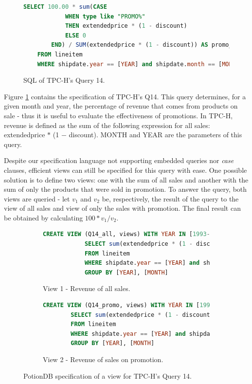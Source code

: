 \documentclass[sigplan,review,anonymous]{acmart}
\begin{document}
\begin{figure}[h]
	\begin{lstlisting}[language=SQL]
	SELECT 100.00 * sum(CASE
			WHEN type like "PROMO%"
			THEN extendedprice * (1 - discount)
			ELSE 0
		END) / SUM(extendedprice * (1 - discount)) AS promo_revenue
	FROM lineitem
	WHERE shipdate.year == [YEAR] and shipdate.month == [MONTH]
	\end{lstlisting}
	\caption{SQL of TPC-H's Query 14.}
	\label{fig:q14}
\end{figure}

Figure \ref{fig:q14} contains the specification of TPC-H's Q14.
This query determines, for a given month and year, the percentage of revenue that comes from products on sale - thus it is useful to evaluate the effectiveness of promotions.
In TPC-H, revenue is defined as the sum of the following expression for all sales: extendedprice $*$ (1 $-$ discount).
MONTH and YEAR are the parameters of this query.

Despite our specification language not supporting embedded queries nor \emph{case} clauses, efficient views can still be specified for this query with ease.
One possible solution is to define two views: %
one with the sum of all sales and another with the sum of only the products that were sold in promotion.
To answer the query, both views are queried - let $v_1$ and $v_2$ be, respectively, the result of the query to the view of all sales and view of only the sales with promotion.
The final result can be obtained by calculating $100 * v_1 / v_2$.

\begin{figure}[h]
	\begin{subfigure}{\linewidth}
		\begin{lstlisting}[language=SQL]
			CREATE VIEW (Q14_all, views) WITH YEAR IN [1993-1997], MONTH IN [1-12] AS
			SELECT sum(extendedprice * (1 - discount)) AS revenue
			FROM lineitem
			WHERE shipdate.year == [YEAR] and shipdate.month == [MONTH]
			GROUP BY [YEAR], [MONTH]
		\end{lstlisting}
		\caption{View 1 - Revenue of all sales.}
	\end{subfigure}
	\begin{subfigure}{\linewidth}
		\begin{lstlisting}[language=SQL]
		CREATE VIEW (Q14_promo, views) WITH YEAR IN [1993-1997], MONTH IN [1-12] AS
		SELECT sum(extendedprice * (1 - discount)) AS promo_revenue
		FROM lineitem
		WHERE shipdate.year == [YEAR] and shipdate.month == [MONTH] and type starts with "PROMO"
		GROUP BY [YEAR], [MONTH]
		\end{lstlisting}
		\caption{View 2 - Revenue of sales on promotion.}
	\end{subfigure}
	\caption{PotionDB specification of a view for TPC-H's Query 14.} %
	\label{fig:q14_view}
\end{figure}
\end{document}
